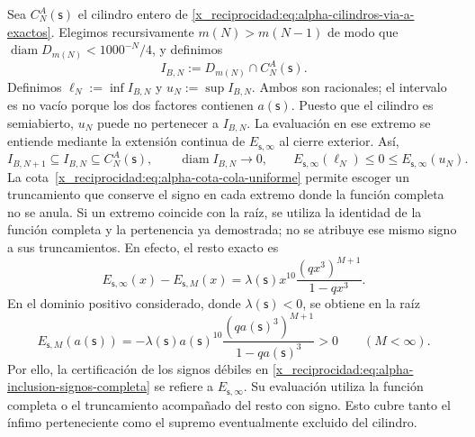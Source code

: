 Sea \(C_N^A(\mathsf s)\) el cilindro entero de
\eqref{x_reciprocidad:eq:alpha-cilindros-via-a-exactos}. Elegimos recursivamente
\(m(N)>m(N-1)\) de modo que
\(\operatorname{diam}D_{m(N)}<1000^{-N}/4\), y definimos
\begin{equation}
I_{B,N}:=D_{m(N)}\cap C_N^A(\mathsf s).
 \label{x_reciprocidad:eq:alpha-intervalos-b-completos}
\end{equation}
Definimos
\(\ell_N:=\inf I_{B,N}\) y \(u_N:=\sup I_{B,N}\). Ambos son racionales;
el intervalo es no vacío porque los dos factores contienen
\(a(\mathsf s)\). Puesto que el cilindro es semiabierto, \(u_N\) puede no
pertenecer a \(I_{B,N}\). La evaluación en ese extremo se entiende mediante
la extensión continua de \(E_{\mathsf s,\infty}\) al cierre exterior. Así,
\begin{equation}
 I_{B,N+1}\subseteq I_{B,N}\subseteq C_N^A(\mathsf s),
 \qquad \operatorname{diam}I_{B,N}\longrightarrow0,
 \qquad E_{\mathsf s,\infty}(\ell_N)\leq0\leq
 E_{\mathsf s,\infty}(u_N).
 \label{x_reciprocidad:eq:alpha-inclusion-signos-completa}
\end{equation}
La cota~\eqref{x_reciprocidad:eq:alpha-cota-cola-uniforme} permite escoger un
truncamiento que conserve el signo en cada extremo donde la función completa
no se anula. Si un extremo coincide con la raíz, se utiliza la identidad de
la función completa y la pertenencia ya demostrada; no se atribuye ese mismo
signo a sus truncamientos. En efecto, el resto exacto es
\[
 E_{\mathsf s,\infty}(x)-E_{\mathsf s,M}(x)
 =\lambda(\mathsf s)x^{10}
   \frac{(qx^3)^{M+1}}{1-qx^3}.
\]
En el dominio positivo considerado, donde \(\lambda(\mathsf s)<0\), se
obtiene en la raíz
\[
 E_{\mathsf s,M}(a(\mathsf s))
 =-\lambda(\mathsf s)a(\mathsf s)^{10}
   \frac{(qa(\mathsf s)^3)^{M+1}}{1-qa(\mathsf s)^3}>0
 \qquad(M<\infty).
\]
Por ello, la certificación de los signos débiles en
\eqref{x_reciprocidad:eq:alpha-inclusion-signos-completa} se refiere a
\(E_{\mathsf s,\infty}\). Su evaluación utiliza la función completa o el
truncamiento acompañado del resto con signo. Esto cubre tanto el ínfimo
perteneciente como el supremo eventualmente excluido del cilindro.

